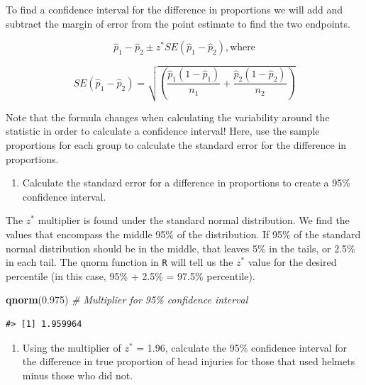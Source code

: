 \documentclass[
]{report}
\newenvironment{Shaded}{\begin{snugshade}}{\end{snugshade}}
\newcommand{\CommentTok}[1]{\textcolor[rgb]{0.56,0.35,0.01}{\textit{#1}}}
\newcommand{\FloatTok}[1]{\textcolor[rgb]{0.00,0.00,0.81}{#1}}
\newcommand{\KeywordTok}[1]{\textcolor[rgb]{0.13,0.29,0.53}{\textbf{#1}}}
\newcommand{\NormalTok}[1]{#1}
\providecommand{\tightlist}{%
  \setlength{\itemsep}{0pt}\setlength{\parskip}{0pt}}
\begin{document}
\vspace{0.4in}

To find a confidence interval for the difference in proportions we will add and subtract the margin of error from the point estimate to find the two endpoints.

\[\hat{p}_1-\hat{p}_2\pm z^*SE(\hat{p}_1-\hat{p}_2), \text{where}\]

\[SE(\hat{p}_1-\hat{p}_2) = \sqrt{\left(\frac{\hat{p}_1 (1-\hat{p}_1)}{n_1}+\frac{\hat{p}_2 (1-\hat{p}_2)}{n_2}\right)}\]

Note that the formula changes when calculating the variability around the statistic in order to calculate a confidence interval! Here, use the sample proportions for each group to calculate the standard error for the difference in proportions.

\begin{enumerate}
\def\labelenumi{\arabic{enumi}.}
\setcounter{enumi}{20}
\tightlist
\item
  Calculate the standard error for a difference in proportions to create a 95\% confidence interval.
\end{enumerate}

\vspace{1in}

The \(z^*\) multiplier is found under the standard normal distribution. We find the values that encompass the middle 95\% of the distribution. If 95\% of the standard normal distribution should be in the middle, that leaves 5\% in the tails, or 2.5\% in each tail. The qnorm function in \texttt{R} will tell us the \(z^*\) value for the desired percentile (in this case, 95\% + 2.5\% = 97.5\% percentile).

\begin{Shaded}
\begin{Highlighting}[]
\KeywordTok{qnorm}\NormalTok{(}\FloatTok{0.975}\NormalTok{) }\CommentTok{\# Multiplier for 95\% confidence interval}
\end{Highlighting}
\end{Shaded}

\begin{verbatim}
#> [1] 1.959964
\end{verbatim}

\begin{enumerate}
\def\labelenumi{\arabic{enumi}.}
\setcounter{enumi}{21}
\tightlist
\item
  Using the multiplier of \(z^*\) = 1.96, calculate the 95\% confidence interval for the difference in true proportion of head injuries for those that used helmets minus those who did not.
\end{enumerate}
\end{document}
